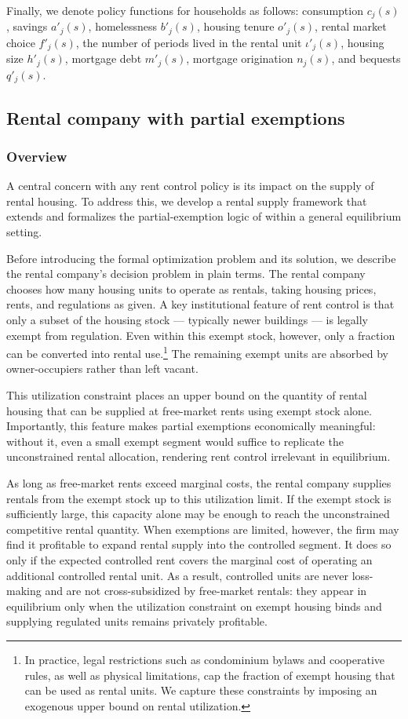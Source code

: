 \documentclass[parskip=full]{article}
\begin{document}
Finally, we denote policy functions for households as follows: consumption $c_{j}(s)$, savings $a'_{j}(s)$, homelessness $b'_{j}(s)$, housing tenure $o'_{j}(s)$, rental market choice $f'_{j}(s)$, the number of periods lived in the rental unit $\iota'_{j}(s)$, housing size $h'_{j}(s)$, mortgage debt $m'_{j}(s)$, mortgage origination $n_{j}(s)$, and bequests $q'_{j}(s)$.

\subsection{Rental company with partial exemptions}\label{sec:rental_company}

\subsubsection{Overview}

A central concern with any rent control policy is its impact on the supply of rental housing. To address this, we develop a rental supply framework that extends and formalizes the partial-exemption logic of \citet{fallis-1985} within a general equilibrium setting.

Before introducing the formal optimization problem and its solution, we describe the rental company’s decision problem in plain terms. The rental company chooses how many housing units to operate as rentals, taking housing prices, rents, and regulations as given. A key institutional feature of rent control is that only a subset of the housing stock — typically newer buildings — is legally exempt from regulation. Even within this exempt stock, however, only a fraction can be converted into rental use.\footnote{In practice, legal restrictions such as condominium bylaws and cooperative rules, as well as physical limitations, cap the fraction of exempt housing that can be used as rental units. We capture these constraints by imposing an exogenous upper bound on rental utilization.} The remaining exempt units are absorbed by owner-occupiers rather than left vacant.

This utilization constraint places an upper bound on the quantity of rental housing that can be supplied at free-market rents using exempt stock alone. Importantly, this feature makes partial exemptions economically meaningful: without it, even a small exempt segment would suffice to replicate the unconstrained rental allocation, rendering rent control irrelevant in equilibrium.

As long as free-market rents exceed marginal costs, the rental company supplies rentals from the exempt stock up to this utilization limit. If the exempt stock is sufficiently large, this capacity alone may be enough to reach the unconstrained competitive rental quantity. When exemptions are limited, however, the firm may find it profitable to expand rental supply into the controlled segment. It does so only if the expected controlled rent covers the marginal cost of operating an additional controlled rental unit. As a result, controlled units are never loss-making and are not cross-subsidized by free-market rentals: they appear in equilibrium only when the utilization constraint on exempt housing binds and supplying regulated units remains privately profitable.
\end{document}
